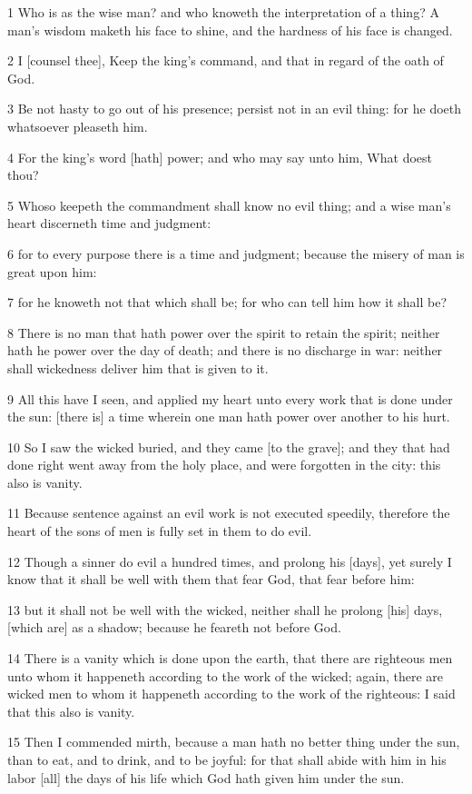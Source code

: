 \par 1 Who is as the wise man? and who knoweth the interpretation of a thing? A man's wisdom maketh his face to shine, and the hardness of his face is changed.
\par 2 I [counsel thee], Keep the king's command, and that in regard of the oath of God.
\par 3 Be not hasty to go out of his presence; persist not in an evil thing: for he doeth whatsoever pleaseth him.
\par 4 For the king's word [hath] power; and who may say unto him, What doest thou?
\par 5 Whoso keepeth the commandment shall know no evil thing; and a wise man's heart discerneth time and judgment:
\par 6 for to every purpose there is a time and judgment; because the misery of man is great upon him:
\par 7 for he knoweth not that which shall be; for who can tell him how it shall be?
\par 8 There is no man that hath power over the spirit to retain the spirit; neither hath he power over the day of death; and there is no discharge in war: neither shall wickedness deliver him that is given to it.
\par 9 All this have I seen, and applied my heart unto every work that is done under the sun: [there is] a time wherein one man hath power over another to his hurt.
\par 10 So I saw the wicked buried, and they came [to the grave]; and they that had done right went away from the holy place, and were forgotten in the city: this also is vanity.
\par 11 Because sentence against an evil work is not executed speedily, therefore the heart of the sons of men is fully set in them to do evil.
\par 12 Though a sinner do evil a hundred times, and prolong his [days], yet surely I know that it shall be well with them that fear God, that fear before him:
\par 13 but it shall not be well with the wicked, neither shall he prolong [his] days, [which are] as a shadow; because he feareth not before God.
\par 14 There is a vanity which is done upon the earth, that there are righteous men unto whom it happeneth according to the work of the wicked; again, there are wicked men to whom it happeneth according to the work of the righteous: I said that this also is vanity.
\par 15 Then I commended mirth, because a man hath no better thing under the sun, than to eat, and to drink, and to be joyful: for that shall abide with him in his labor [all] the days of his life which God hath given him under the sun.
